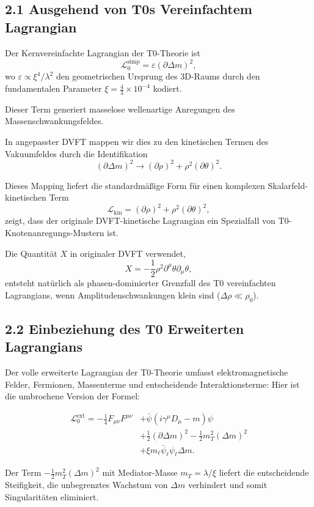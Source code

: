 	\subsection{2.1 Ausgehend von T0s Vereinfachtem Lagrangian}
	
	Der Kernvereinfachte Lagrangian der T0-Theorie ist
	\[
	\mathcal{L}_0^{\text{simp}} = \varepsilon (\partial \Delta m)^2,
	\]
	wo $\varepsilon \propto \xi^4 / \lambda^2$ den geometrischen Ursprung des 3D-Raums durch den fundamentalen Parameter $\xi = \frac{4}{3} \times 10^{-4}$ kodiert.
	
	Dieser Term generiert masselose wellenartige Anregungen des Massenschwankungsfeldes.
	
	In angepasster DVFT mappen wir dies zu den kinetischen Termen des Vakuumfeldes durch die Identifikation
	\[
	(\partial \Delta m)^2 \to (\partial \rho)^2 + \rho^2 (\partial \theta)^2.
	\]
	
	Dieses Mapping liefert die standardmäßige Form für einen komplexen Skalarfeld-kinetischen Term
	\[
	\mathcal{L}_{\text{kin}} = (\partial \rho)^2 + \rho^2 (\partial \theta)^2,
	\]
	zeigt, dass der originale DVFT-kinetische Lagrangian ein Spezialfall von T0-Knotenanregungs-Mustern ist.
	
	Die Quantität $X$ in originaler DVFT verwendet,
	\[
	X = -\frac{1}{2} \rho^2 \partial^\mu \theta \partial_\mu \theta,
	\]
	entsteht natürlich als phasen-dominierter Grenzfall des T0 vereinfachten Lagrangians, wenn Amplitudenschwankungen klein sind ($\Delta \rho \ll \rho_0$).
	
	\subsection{2.2 Einbeziehung des T0 Erweiterten Lagrangians}
	
	Der volle erweiterte Lagrangian der T0-Theorie umfasst elektromagnetische Felder, Fermionen, Massenterme und entscheidende Interaktionsterme:
Hier ist die umbrochene Version der Formel:

\[
\begin{aligned}
	\mathcal{L}_0^{\text{ext}} = -\frac{1}{4} F_{\mu\nu}F^{\mu\nu} &+ \bar{\psi}(i\gamma^\mu D_\mu - m)\psi \\
	&+ \frac{1}{2}(\partial \Delta m)^2 - \frac{1}{2} m_T^2 (\Delta m)^2 \\
	&+ \xi m_\ell \bar{\psi}_\ell \psi_\ell \Delta m.
\end{aligned}
\]
	
	Der Term $-\frac{1}{2} m_T^2 (\Delta m)^2$ mit Mediator-Masse $m_T = \lambda / \xi$ liefert die entscheidende Steifigkeit, die unbegrenztes Wachstum von $\Delta m$ verhindert und somit Singularitäten eliminiert.
	

